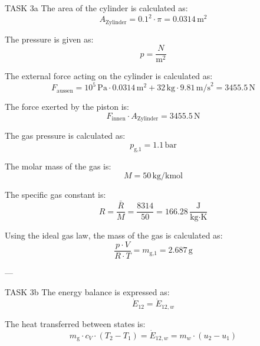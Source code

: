 TASK 3a  
The area of the cylinder is calculated as:  
\[
A_{\text{Zylinder}} = 0.1^2 \cdot \pi = 0.0314 \, \text{m}^2
\]  

The pressure is given as:  
\[
p = \frac{N}{\text{m}^2}
\]  

The external force acting on the cylinder is calculated as:  
\[
F_{\text{aussen}} = 10^5 \, \text{Pa} \cdot 0.0314 \, \text{m}^2 + 32 \, \text{kg} \cdot 9.81 \, \text{m/s}^2 = 3455.5 \, \text{N}
\]  

The force exerted by the piston is:  
\[
F_{\text{innen}} \cdot A_{\text{Zylinder}} = 3455.5 \, \text{N}
\]  

The gas pressure is calculated as:  
\[
p_{\text{g,1}} = 1.1 \, \text{bar}
\]  

The molar mass of the gas is:  
\[
M = 50 \, \text{kg/kmol}
\]  

The specific gas constant is:  
\[
R = \frac{\bar{R}}{M} = \frac{8314}{50} = 166.28 \, \frac{\text{J}}{\text{kg·K}}
\]  

Using the ideal gas law, the mass of the gas is calculated as:  
\[
\frac{p \cdot V}{R \cdot T} = m_{\text{g,1}} = 2.687 \, \text{g}
\]  

---

TASK 3b  
The energy balance is expressed as:  
\[
\dot{E}_{12} = \dot{E}_{12,w}
\]  

The heat transferred between states is:  
\[
m_{\text{g}} \cdot c_V \cdot (T_2 - T_1) = \dot{E}_{12,w} = m_w \cdot (u_2 - u_1)
\]  